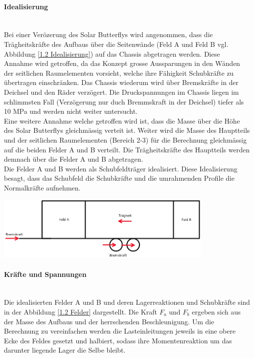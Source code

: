   \paragraph{Idealisierung}\mbox{}\\
  Bei einer Verözerung des Solar Butterflys wird angenommen, dass die Trägheitskräfte des Aufbaus über die Seitenwände (Feld A und Feld B vgl. Abbildung \ref{1.2 Idealisierung}) auf das Chassis abgetragen werden. Diese Annahme wird getroffen, da das Konzept grosse Aussparungen in den Wänden der seitlichen Raumelementen vorsieht, welche ihre Fähigkeit Schubkräfte zu übertragen einschränken. Das Chassis wiederum wird über Bremskräfte in der Deichsel und den Räder verzögert. Die Druckspannungen im Chassis liegen im schlimmsten Fall (Verzögerung nur duch Bremmskraft in der Deichsel) tiefer als 10 MPa und werden nicht weiter untersucht.\\
  Eine weitere Annahme welche getroffen wird ist, dass die Masse über die Höhe des Solar Butterflys gleichmässig verteit ist. Weiter wird die Masse des Hauptteils und der seitlichen Raumelementen (Bereich 2-3) für die Berechnung gleichmässig auf die beiden Felder A und B verteilt. Die Trägheitskräfte des Hauptteils werden demnach über die Felder A und B abgetragen.\\
  Die Felder A und B werden als Schubfeldträger idealisiert. Diese Idealisierung besagt, dass das Schubfeld die Schubkräfte und die umrahmenden Profile die Normalkräfte aufnehmen.

  \begin{center}
    \includegraphics[width=0.8\textwidth]{04_Figures/1.2 Idealisierung.png}
    \label{1.2 Idealisierung}
  \end{center}

  \paragraph{Kräfte und Spannungen}\mbox{}\\
  Die idealisierten Felder A und B und deren Lagerreaktionen und Schubkräfte sind in der Abbildung \ref{1.2 Felder} dargestellt. Die Kraft $F_a$ und $F_b$ ergeben sich aus der Masse des Aufbaus und der herrschenden Beschleunigung. Um die Berechnung zu vereinfachen werden die Lasteinleitungen jeweils in eine obere Ecke des Feldes gesetzt und halbiert, sodass ihre Momentenreaktion um das darunter liegende Lager die Selbe bleibt.

